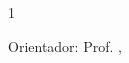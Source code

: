 \newpage
\thispagestyle{empty}
\makeatletter
\begin{spacing}{1}
  \begin{center}

    \@author

    \vspace{3cm}
    \MakeUppercase{\@title}\@subtitulo

  \end{center}

  \vspace{2cm}
  \hfill\parbox{9.3cm}{\noindent\justifying\nohyphens{\@textofolharosto}}

  \vspace{3cm}
  Orientador: Prof. \@orientador, \@orientadorestitulo


  \vspace*{\fill}
  \begin{center}
    \@cidade\\
    \@date
  \end{center}
\end{spacing}
\makeatother
\clearpage
